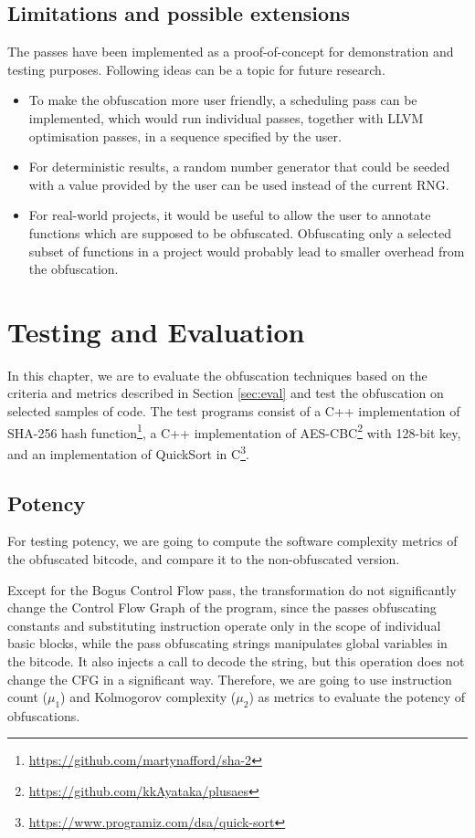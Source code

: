 \documentclass[
  digital, %
  notable,   %
  twoside, %
  nolof,     %
  nolot,     %
]{fithesis3}
\theoremstyle{definition}
\begin{document}
\section{Limitations and possible extensions}
The passes have been implemented as a proof-of-concept for demonstration and testing purposes. Following ideas can be a topic for future research.
\begin{itemize}
    \item To make the obfuscation more user friendly, a scheduling pass can be implemented, which would run individual passes, together with LLVM optimisation passes, in a sequence specified by the user. 
    \item For deterministic results, a random number generator that could be seeded with a value provided by the user can be used instead of the current RNG. 
    \item For real-world projects, it would be useful to allow the user to annotate functions which are supposed to be obfuscated. Obfuscating only a selected subset of functions in a project would probably lead to smaller overhead from the obfuscation. 
\end{itemize}

\chapter{Testing and Evaluation}
In this chapter, we are to evaluate the obfuscation techniques based on the criteria and metrics described in Section \ref{sec:eval} 
and test the obfuscation on selected samples of code. The test programs consist of a C++ implementation of SHA-256 hash function\footnote{\url{https://github.com/martynafford/sha-2}}, a C++ implementation of AES-CBC\footnote{\url{https://github.com/kkAyataka/plusaes}} with 128-bit key, and an implementation of QuickSort in C\footnote{\url{https://www.programiz.com/dsa/quick-sort}}.

\section{Potency}
For testing potency, we are going to compute the software complexity metrics of the obfuscated bitcode, and compare it to the non-obfuscated version. 

Except for the Bogus Control Flow pass, the transformation do not significantly change the Control Flow Graph of the program, since the passes obfuscating constants and substituting instruction operate only in the scope of individual basic blocks, while the pass obfuscating strings manipulates global variables in the bitcode. It also injects a call to decode the string, but this operation does not change the CFG in a significant way. Therefore, we are going to use instruction count ($\mu_1$) and Kolmogorov complexity ($\mu_2$) as metrics to evaluate the potency of obfuscations. 
\end{document}
